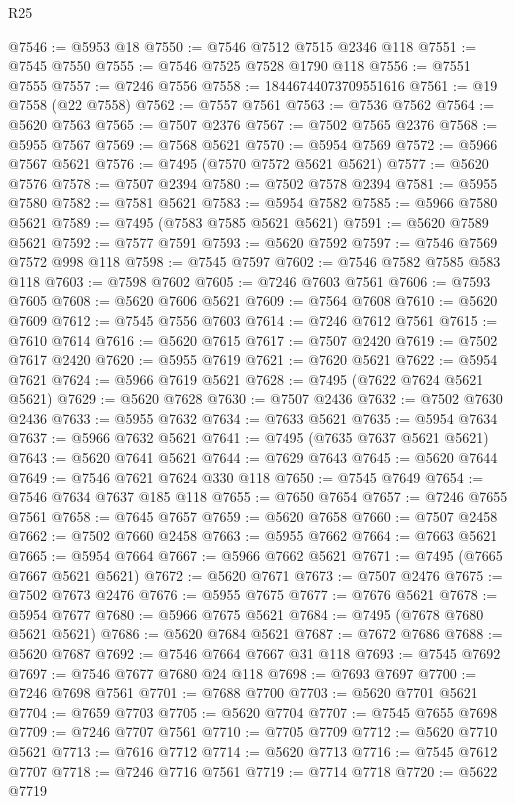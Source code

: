 \begin{lexlean}{R25}
\begin{coremodule}
@7546 := @5953 @18
@7550 := @7546 @7512 @7515 @2346 @118
@7551 := @7545 @7550
@7555 := @7546 @7525 @7528 @1790 @118
@7556 := @7551 @7555
@7557 := @7246 @7556
@7558 := 18446744073709551616
@7561 := @19 @7558 (@22 @7558)
@7562 := @7557 @7561
@7563 := @7536 @7562
@7564 := @5620 @7563
@7565 := @7507 @2376
@7567 := @7502 @7565 @2376
@7568 := @5955 @7567
@7569 := @7568 @5621
@7570 := @5954 @7569
@7572 := @5966 @7567 @5621
@7576 := @7495 (@7570 @7572 @5621 @5621)
@7577 := @5620 @7576
@7578 := @7507 @2394
@7580 := @7502 @7578 @2394
@7581 := @5955 @7580
@7582 := @7581 @5621
@7583 := @5954 @7582
@7585 := @5966 @7580 @5621
@7589 := @7495 (@7583 @7585 @5621 @5621)
@7591 := @5620 @7589 @5621
@7592 := @7577 @7591
@7593 := @5620 @7592
@7597 := @7546 @7569 @7572 @998 @118
@7598 := @7545 @7597
@7602 := @7546 @7582 @7585 @583 @118
@7603 := @7598 @7602
@7605 := @7246 @7603 @7561
@7606 := @7593 @7605
@7608 := @5620 @7606 @5621
@7609 := @7564 @7608
@7610 := @5620 @7609
@7612 := @7545 @7556 @7603
@7614 := @7246 @7612 @7561
@7615 := @7610 @7614
@7616 := @5620 @7615
@7617 := @7507 @2420
@7619 := @7502 @7617 @2420
@7620 := @5955 @7619
@7621 := @7620 @5621
@7622 := @5954 @7621
@7624 := @5966 @7619 @5621
@7628 := @7495 (@7622 @7624 @5621 @5621)
@7629 := @5620 @7628
@7630 := @7507 @2436
@7632 := @7502 @7630 @2436
@7633 := @5955 @7632
@7634 := @7633 @5621
@7635 := @5954 @7634
@7637 := @5966 @7632 @5621
@7641 := @7495 (@7635 @7637 @5621 @5621)
@7643 := @5620 @7641 @5621
@7644 := @7629 @7643
@7645 := @5620 @7644
@7649 := @7546 @7621 @7624 @330 @118
@7650 := @7545 @7649
@7654 := @7546 @7634 @7637 @185 @118
@7655 := @7650 @7654
@7657 := @7246 @7655 @7561
@7658 := @7645 @7657
@7659 := @5620 @7658
@7660 := @7507 @2458
@7662 := @7502 @7660 @2458
@7663 := @5955 @7662
@7664 := @7663 @5621
@7665 := @5954 @7664
@7667 := @5966 @7662 @5621
@7671 := @7495 (@7665 @7667 @5621 @5621)
@7672 := @5620 @7671
@7673 := @7507 @2476
@7675 := @7502 @7673 @2476
@7676 := @5955 @7675
@7677 := @7676 @5621
@7678 := @5954 @7677
@7680 := @5966 @7675 @5621
@7684 := @7495 (@7678 @7680 @5621 @5621)
@7686 := @5620 @7684 @5621
@7687 := @7672 @7686
@7688 := @5620 @7687
@7692 := @7546 @7664 @7667 @31 @118
@7693 := @7545 @7692
@7697 := @7546 @7677 @7680 @24 @118
@7698 := @7693 @7697
@7700 := @7246 @7698 @7561
@7701 := @7688 @7700
@7703 := @5620 @7701 @5621
@7704 := @7659 @7703
@7705 := @5620 @7704
@7707 := @7545 @7655 @7698
@7709 := @7246 @7707 @7561
@7710 := @7705 @7709
@7712 := @5620 @7710 @5621
@7713 := @7616 @7712
@7714 := @5620 @7713
@7716 := @7545 @7612 @7707
@7718 := @7246 @7716 @7561
@7719 := @7714 @7718
@7720 := @5622 @7719

\end{coremodule}
\end{lexlean}
